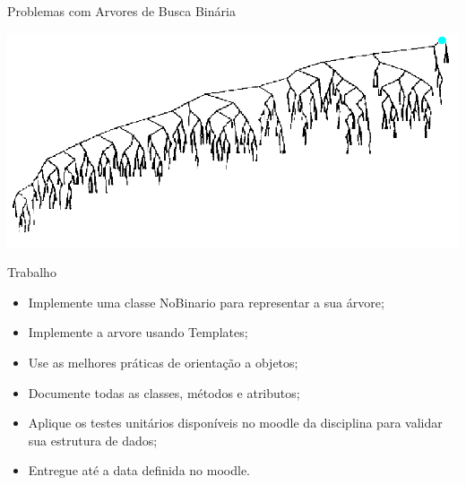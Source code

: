 \documentclass[12pt,table,xcolor={dvipsnames}]{beamer}
\begin{document}
\begin{frame}[fragile]{Problemas com Arvores de Busca Binária}
\begin{center}
\includegraphics[scale=.35]{deter1.png} 
\end{center}
\end{frame}


\begin{frame}[fragile]{Trabalho}
\begin{itemize}
\item Implemente uma classe NoBinario para representar a sua árvore;
\item Implemente a arvore usando Templates;
\item Use as melhores práticas de orientação a objetos;
\item Documente todas as classes, métodos e atributos;
\item Aplique os testes unitários disponíveis no moodle da disciplina para validar sua estrutura de dados;
\item Entregue até a data definida no moodle.
\end{itemize}
\end{frame}
\end{document}
